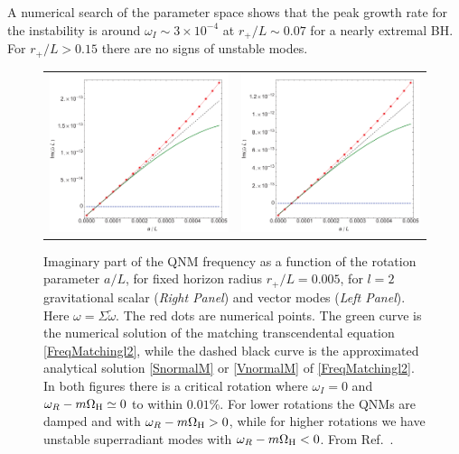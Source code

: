 \documentclass[11pt]{article}
\numberwithin{equation}{section} %
\begin{document}
A numerical search of the parameter space shows that the peak growth rate for the instability is around $\omega_I\sim 3\times 10^{-4}$
at $r_+/L\sim 0.07$ for a nearly extremal BH. For $r_+/L>0.15$ there are no signs of unstable modes.


%
\begin{figure}[ht]
\centering
\begin{tabular}{cc}
 \includegraphics[width=.48\textwidth]{matchnums.pdf}&
 \includegraphics[width=.48\textwidth]{matchnumv.pdf}
\end{tabular}
\caption{
Imaginary part of the QNM frequency as a function of the rotation parameter $a/L$, for fixed horizon radius $r_+/L=0.005$, for $l=2$ gravitational scalar ({\it Right Panel}) and vector modes ({\it Left Panel}). 
Here $\omega=\Sigma\tilde{\omega}$.
The red dots are numerical points. The green curve is the numerical solution of the matching transcendental equation \eqref{FreqMatchingl2}, while the dashed black curve is the approximated analytical solution \eqref{SnormalM} or \eqref{VnormalM} of \eqref{FreqMatchingl2}. In both figures there is a critical rotation where $\omega_I=0$ and $\omega_R-m\Omega_{\rm H}\simeq 0$ to within $0.01\%$. For lower rotations the QNMs are damped and with $\omega_R-m\Omega_{\rm H}>0$, while for higher rotations we have unstable superradiant modes with $\omega_R-m\Omega_{\rm H}<0$.
From Ref.~\cite{Cardoso:2013pza}.}\label{Fig:matchNum}
\end{figure}  
\end{document}
